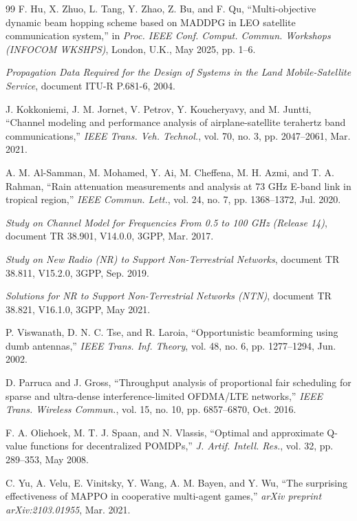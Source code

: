 \documentclass[journal]{IEEEtran}
\begin{document}
\begin{thebibliography}{99}
 F. Hu, X. Zhuo, L. Tang, Y. Zhao, Z. Bu, and F. Qu, ``Multi-objective dynamic beam hopping scheme based on MADDPG in LEO satellite communication system,'' in \textit{Proc. IEEE Conf. Comput. Commun. Workshops (INFOCOM WKSHPS)}, London, U.K., May 2025, pp. 1--6.

 \textit{Propagation Data Required for the Design of Systems in the Land Mobile-Satellite Service}, document ITU-R P.681-6, 2004.

 J. Kokkoniemi, J. M. Jornet, V. Petrov, Y. Koucheryavy, and M. Juntti, ``Channel modeling and performance analysis of airplane-satellite terahertz band communications,'' \textit{IEEE Trans. Veh. Technol.}, vol. 70, no. 3, pp. 2047--2061, Mar. 2021.

 A. M. Al-Samman, M. Mohamed, Y. Ai, M. Cheffena, M. H. Azmi, and T. A. Rahman, ``Rain attenuation measurements and analysis at 73 GHz E-band link in tropical region,'' \textit{IEEE Commun. Lett.}, vol. 24, no. 7, pp. 1368--1372, Jul. 2020.

 \textit{Study on Channel Model for Frequencies From 0.5 to 100 GHz (Release 14)}, document TR 38.901, V14.0.0, 3GPP, Mar. 2017.

 \textit{Study on New Radio (NR) to Support Non-Terrestrial Networks}, document TR 38.811, V15.2.0, 3GPP, Sep. 2019.

 \textit{Solutions for NR to Support Non-Terrestrial Networks (NTN)}, document TR 38.821, V16.1.0, 3GPP, May 2021.

 P. Viswanath, D. N. C. Tse, and R. Laroia, ``Opportunistic beamforming using dumb antennas,'' \textit{IEEE Trans. Inf. Theory}, vol. 48, no. 6, pp. 1277--1294, Jun. 2002.

 D. Parruca and J. Gross, ``Throughput analysis of proportional fair scheduling for sparse and ultra-dense interference-limited OFDMA/LTE networks,'' \textit{IEEE Trans. Wireless Commun.}, vol. 15, no. 10, pp. 6857--6870, Oct. 2016.

 F. A. Oliehoek, M. T. J. Spaan, and N. Vlassis, ``Optimal and approximate Q-value functions for decentralized POMDPs,'' \textit{J. Artif. Intell. Res.}, vol. 32, pp. 289--353, May 2008.

 C. Yu, A. Velu, E. Vinitsky, Y. Wang, A. M. Bayen, and Y. Wu, ``The surprising effectiveness of MAPPO in cooperative multi-agent games,'' \textit{arXiv preprint arXiv:2103.01955}, Mar. 2021.


\end{thebibliography}
\end{document}
